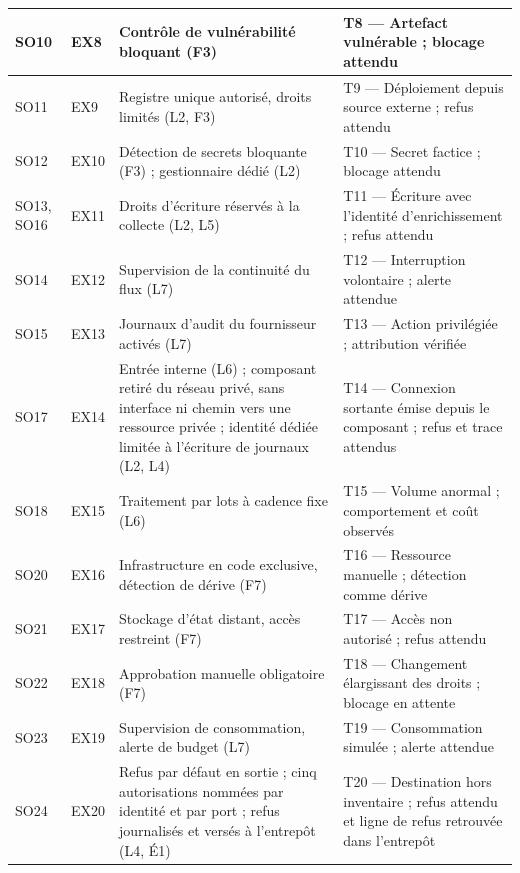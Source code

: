 {\begin{longtable}{|P{1.5cm}|P{1.0cm}|P{6.3cm}|P{6.2cm}|}
SO10 & EX8 & Contrôle de vulnérabilité bloquant (F3) & T8 — Artefact vulnérable ; blocage attendu \\ \hline
SO11 & EX9 & Registre unique autorisé, droits limités (L2, F3) & T9 — Déploiement depuis source externe ; refus attendu \\ \hline
SO12 & EX10 & Détection de secrets bloquante (F3) ; gestionnaire dédié (L2) & T10 — Secret factice ; blocage attendu \\ \hline
SO13, SO16 & EX11 & Droits d'écriture réservés à la collecte (L2, L5) & T11 — Écriture avec l'identité d'enrichissement ; refus attendu \\ \hline
SO14 & EX12 & Supervision de la continuité du flux (L7) & T12 — Interruption volontaire ; alerte attendue \\ \hline
SO15 & EX13 & Journaux d'audit du fournisseur activés (L7) & T13 — Action privilégiée ; attribution vérifiée \\ \hline
SO17 & EX14 & Entrée interne (L6) ; composant retiré du réseau privé, sans interface ni chemin vers une ressource privée ; identité dédiée limitée à l'écriture de journaux (L2, L4) & T14 — Connexion sortante émise depuis le composant ; refus et trace attendus \\ \hline
SO18 & EX15 & Traitement par lots à cadence fixe (L6) & T15 — Volume anormal ; comportement et coût observés \\ \hline
SO20 & EX16 & Infrastructure en code exclusive, détection de dérive (F7) & T16 — Ressource manuelle ; détection comme dérive \\ \hline
SO21 & EX17 & Stockage d'état distant, accès restreint (F7) & T17 — Accès non autorisé ; refus attendu \\ \hline
SO22 & EX18 & Approbation manuelle obligatoire (F7) & T18 — Changement élargissant des droits ; blocage en attente \\ \hline
SO23 & EX19 & Supervision de consommation, alerte de budget (L7) & T19 — Consommation simulée ; alerte attendue \\ \hline
SO24 & EX20 & Refus par défaut en sortie ; cinq autorisations nommées par identité et par port ; refus journalisés et versés à l'entrepôt (L4, É1) & T20 — Destination hors inventaire ; refus attendu et ligne de refus retrouvée dans l'entrepôt \\
\hline
\end{longtable}
}

